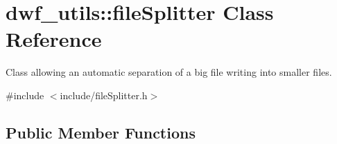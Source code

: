 \hypertarget{classdwf__utils_1_1file_splitter}{\section{dwf\-\_\-utils\-:\-:file\-Splitter \-Class \-Reference}
\label{classdwf__utils_1_1file_splitter}
}


\-Class allowing an automatic separation of a big file writing into smaller files.  




{\ttfamily \#include $<$include/file\-Splitter.\-h$>$}

\subsection*{\-Public \-Member \-Functions}

